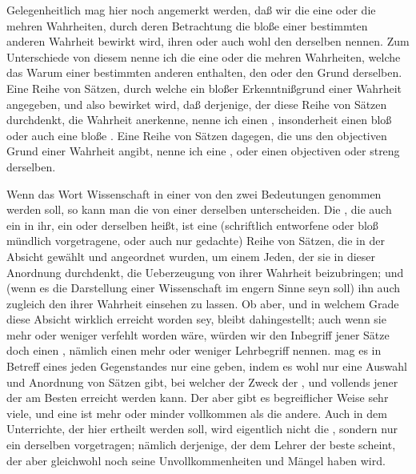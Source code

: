 \begin{aufza}
\item Gelegenheitlich mag hier noch angemerkt werden, daß wir die eine oder die mehren Wahrheiten, durch deren Betrachtung die bloße  einer bestimmten anderen Wahrheit bewirkt wird, ihren  oder auch wohl den  derselben nennen. Zum Unterschiede von diesem nenne ich die eine oder die mehren Wahrheiten, welche das Warum einer bestimmten anderen enthalten, den  oder den  Grund derselben. Eine Reihe von Sätzen, durch welche ein bloßer Erkenntnißgrund einer Wahrheit angegeben, und also bewirket wird, daß derjenige, der diese Reihe von Sätzen durchdenkt, die Wahrheit anerkenne, nenne ich einen , insonderheit einen bloß  oder auch eine bloße . Eine Reihe von Sätzen dagegen, die uns den objectiven Grund einer Wahrheit angibt, nenne ich eine , oder einen objectiven oder streng  derselben.
\item Wenn das Wort Wissenschaft in einer von den zwei  Bedeutungen genommen werden soll, so kann man die  von einer  derselben unterscheiden. Die , die auch ein  in ihr, ein  oder  derselben heißt, ist eine (schriftlich entworfene oder bloß mündlich vorgetragene, oder auch nur gedachte) Reihe von Sätzen, die in der Absicht gewählt und angeordnet wurden, um einem Jeden, der sie in dieser Anordnung durchdenkt, die Ueberzeugung von ihrer Wahrheit beizubringen; und (wenn es die Darstellung einer Wissenschaft im engern Sinne seyn soll) ihn auch zugleich den  ihrer Wahrheit einsehen zu lassen. Ob aber, und in welchem Grade diese Absicht wirklich erreicht worden sey, bleibt dahingestellt; auch wenn sie mehr oder weniger verfehlt worden wäre, würden wir den Inbegriff jener Sätze doch einen , nämlich einen mehr oder weniger  Lehrbegriff nennen.  mag es in Betreff eines jeden Gegenstandes nur eine  geben, indem es wohl nur eine  Auswahl und Anordnung von Sätzen gibt, bei welcher der Zweck der , und vollends jener der  am Besten erreicht werden kann. Der  aber gibt es begreiflicher Weise sehr viele, und eine ist mehr oder minder vollkommen als die andere. Auch in dem Unterrichte, der hier ertheilt werden soll, wird eigentlich nicht die , sondern nur ein  derselben vorgetragen; nämlich derjenige, der dem Lehrer der beste scheint, der aber gleichwohl noch seine Unvollkommenheiten und Mängel haben wird.

\end{aufza}
